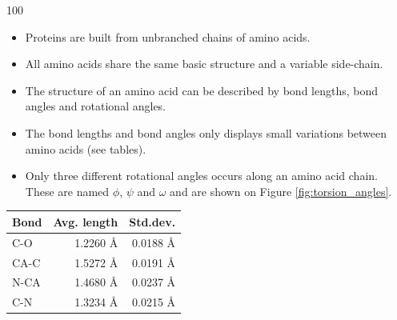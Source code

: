 \documentclass[a0,portrait]{a0poster}
\begin{document}
\begin{GridBlockFill}{0}{44}{100}

  \begin{multicols}{2}
\begin{minipage}{\linewidth} 
    \begin{multicols}{2}

    \begin{itemize}
    \item Proteins are built from unbranched chains of amino acids.
    \item All amino acids share
      the same basic structure and a variable side-chain.
    \item The structure of an amino acid can be described by bond lengths,
      bond angles and rotational angles.
    \item The bond lengths and bond angles only displays small variations
      between amino acids (see tables).
    \item Only three different rotational angles occurs along an amino
      acid chain. These are named $\phi$, $\psi$ and $\omega$ and are
      shown on Figure \ref{fig:torsion_angles}.
    \end{itemize} 
   \end{multicols}


\begin{multicols}{2}


\begin{minipage}{\linewidth} 
\centering

  \vspace{7mm}
  \begin{tabular}{lrr}
    \multicolumn{1}{c}{Bond} & \multicolumn{1}{c}{Avg. length} & \multicolumn{1}{c}{Std.dev.} \\ \midrule
    C-O   & 1.2260 Å & 0.0188 Å\\
    CA-C  & 1.5272 Å & 0.0191 Å\\
    N-CA  & 1.4680 Å & 0.0237 Å\\
    C-N   & 1.3234 Å & 0.0215 Å\\
  \end{tabular}
  \vspace{4mm}
  \label{tab:average_bond_lengths}
\end{minipage}



\end{multicols}
\end{minipage}
\end{multicols}
\end{GridBlockFill}
\end{document}
